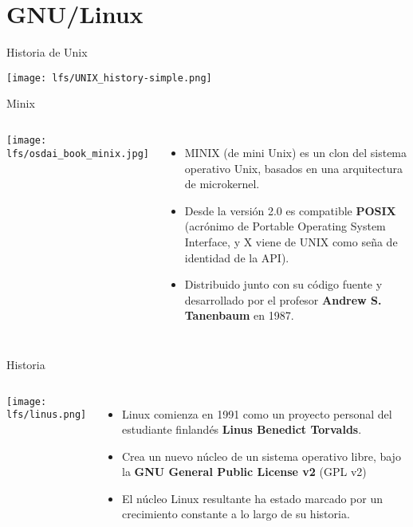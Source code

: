 
\section{GNU/Linux}

\begin{frame}[c]{Historia de Unix}
  \begin{center}
    \texttt{[image: lfs/UNIX\_history-simple.png]}
  \end{center}
\end{frame}

\begin{frame}[c]{Minix}
    \begin{columns}
        \begin{center}
            \texttt{[image: lfs/osdai\_book\_minix.jpg]}
        \end{center}
        \begin{itemize}
          \item MINIX (de mini Unix) es un clon del sistema operativo Unix,
            basados en una arquitectura de microkernel. 
          \pausa
          \item Desde la versión 2.0 es compatible \textbf{POSIX} (acrónimo
            de Portable Operating System Interface, y X viene de UNIX como
            seña de identidad de la API).
          \pausa
          \item Distribuido junto con su código fuente y desarrollado por el
            profesor \textbf{Andrew S. Tanenbaum} en 1987.
        \end{itemize}
    \end{columns}
\end{frame}

\begin{frame}[c]{Historia}
  \begin{columns}
      \begin{center}
        \texttt{[image: lfs/linus.png]}
      \end{center}
     \begin{itemize}
      \item Linux comienza en 1991 como un proyecto personal del estudiante
        finlandés \textbf{Linus Benedict Torvalds}.
      \pausa
      \item Crea un nuevo núcleo de un sistema operativo libre, bajo la
        \textbf{GNU General Public License v2} (GPL v2)
      \pausa
      \item El núcleo Linux resultante ha estado marcado por un crecimiento
        constante a lo largo de su historia.
     \end{itemize}
  \end{columns}
\end{frame}

